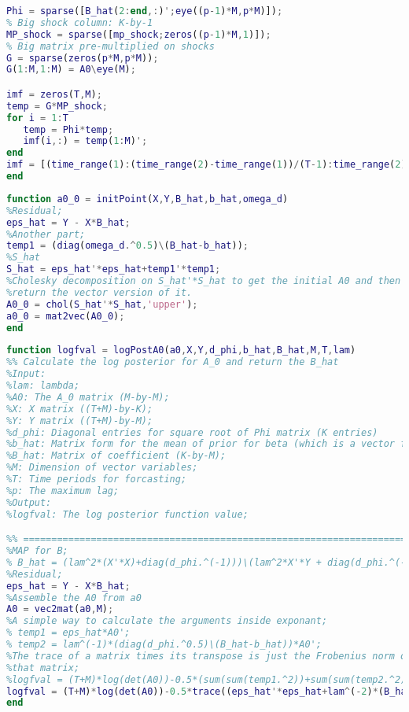 \documentclass[11pt, oneside]{article}   	%
\begin{document}
\begin{appendices}
\begin{lstlisting}[language=Matlab ,caption={\textit{IMF.m} constructs impulse response functions using companion form.}, label={code:IMF}]
% Phi is a K-by-K matrix
Phi = sparse([B_hat(2:end,:)';eye((p-1)*M,p*M)]);
% Big shock column: K-by-1
MP_shock = sparse([mp_shock;zeros((p-1)*M,1)]);
% Big matrix pre-multiplied on shocks
G = sparse(zeros(p*M,p*M));
G(1:M,1:M) = A0\eye(M);

imf = zeros(T,M);
temp = G*MP_shock;
for i = 1:T
   temp = Phi*temp;
   imf(i,:) = temp(1:M)';
end
imf = [(time_range(1):(time_range(2)-time_range(1))/(T-1):time_range(2))',imf];
end
\end{lstlisting}

\begin{lstlisting}[language=Matlab ,caption={\textit{initPoint.m} returns initial guess for global optimization executed by \textit{findGlobalOpt.m}.}, label={code:initPoint}]
function a0_0 = initPoint(X,Y,B_hat,b_hat,omega_d)
%Residual;
eps_hat = Y - X*B_hat;
%Another part;
temp1 = (diag(omega_d.^0.5)\(B_hat-b_hat));
%S_hat
S_hat = eps_hat'*eps_hat+temp1'*temp1;
%Cholesky decomposition on S_hat'*S_hat to get the initial A0 and then
%return the vector version of it.
A0_0 = chol(S_hat'*S_hat,'upper');
a0_0 = mat2vec(A0_0);
end
\end{lstlisting}

\begin{lstlisting}[language=Matlab ,caption={\textit{logPostA0.m} calculates log-posterior of $A_0$.}, label={code:logPostA0}]
function logfval = logPostA0(a0,X,Y,d_phi,b_hat,B_hat,M,T,lam)
%% Calculate the log posterior for A_0 and return the B_hat
%Input:
%lam: lambda;
%A0: The A_0 matrix (M-by-M);
%X: X matrix ((T+M)-by-K);
%Y: Y matrix ((T+M)-by-M);
%d_phi: Diagonal entries for square root of Phi matrix (K entries)
%b_hat: Matrix form for the mean of prior for beta (which is a vector form of B);
%B_hat: Matrix of coefficient (K-by-M);
%M: Dimension of vector variables;
%T: Time periods for forcasting;
%p: The maximum lag;
%Output:
%logfval: The log posterior function value;

%% ==========================================================================
%MAP for B;
% B_hat = (lam^2*(X'*X)+diag(d_phi.^(-1)))\(lam^2*X'*Y + diag(d_phi.^(-1))*b_hat);
%Residual;
eps_hat = Y - X*B_hat;
%Assemble the A0 from a0
A0 = vec2mat(a0,M);
%A simple way to calculate the arguments inside exponant;
% temp1 = eps_hat*A0';
% temp2 = lam^(-1)*(diag(d_phi.^0.5)\(B_hat-b_hat))*A0';
%The trace of a matrix times its transpose is just the Frobenius norm of
%that matrix;
%logfval = (T+M)*log(det(A0))-0.5*(sum(sum(temp1.^2))+sum(sum(temp2.^2))); %equivalent form
logfval = (T+M)*log(det(A0))-0.5*trace((eps_hat'*eps_hat+lam^(-2)*(B_hat-b_hat)'/diag(d_phi)*(B_hat-b_hat))*(A0'*A0));
end
\end{lstlisting}


\end{appendices}
\end{document}
